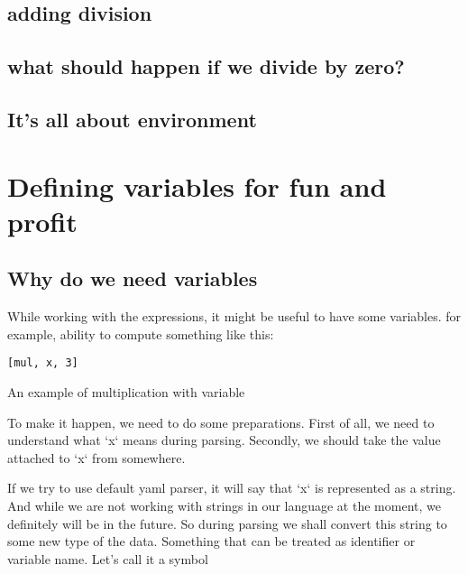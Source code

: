 \documentclass[11pt]{article}
\begin{document}
\subsection{adding division}
\label{sec:orge082dfa}
\subsection{what should happen if we divide by zero?}
\label{sec:org805a5d5}
\subsection{It's all about environment}
\label{sec:org66e8527}
\section{Defining variables for fun and profit}
\label{sec:orgc142de3}
\subsection{Why do we need variables}
\label{sec:org5ab1a71}
While working with the expressions, it might be useful to have some variables.
for example, ability to compute something like this:
\begin{listing}[htbp]
\begin{verbatim}
[mul, x, 3]
\end{verbatim}
\caption{An example of multiplication with variable}
\end{listing}
To make it happen, we need to do some preparations.
First of all, we need to understand what `x` means during parsing.
Secondly, we should take the value attached to `x` from somewhere.

If we try to use default yaml parser, it will say that `x` is represented as a string.
And while we are not working with strings in our language at the moment, we definitely will be in the future.
So during parsing we shall convert this string to some new type of the data.
Something that can be treated as identifier or variable name. Let's call it a symbol
\end{document}
